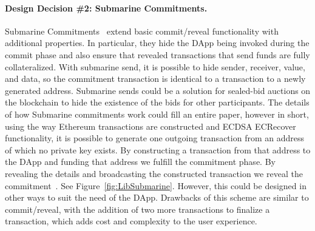 \paragraph{Design Decision \#2: Submarine Commitments.}\label{submarineCommits}
Submarine Commitments~\cite{breidenbach2018enter,submarinesendHD} extend basic commit/reveal functionality with additional properties. In particular, they hide the DApp being invoked during the commit phase and also ensure that revealed transactions that send funds are fully collateralized. With submarine send, it is possible to hide sender, receiver, value, and data, so the commitment transaction is identical to a transaction to a newly generated address. Submarine sends could be a solution for sealed-bid auctions on the blockchain to hide the existence of the bids for other participants. The details of how Submarine commitments work could fill an entire paper, however in short, using the way Ethereum transactions are constructed and ECDSA ECRecover functionality, it is possible to generate one outgoing transaction from an address of which no private key exists. By constructing a transaction from that address to the DApp and funding that address we fulfill the commitment phase. By revealing the details and broadcasting the constructed transaction we reveal the commitment~\cite{libsubmarine}. See Figure~\ref{fig:LibSubmarine}. However, this could be designed in other ways to suit the need of the DApp. Drawbacks of this scheme are similar to commit/reveal, with the addition of two more transactions to finalize a transaction, which adds cost and complexity to the user experience.



